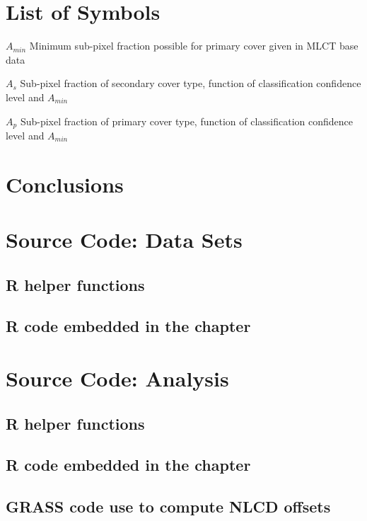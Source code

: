 \documentclass[draftthesis]{neiuthesis}
\begin{document}
\chapter{List of Symbols}

\begin{symbollist}[0.7in]
\item[$A_{min}$] Minimum sub-pixel fraction possible for primary cover
  given in MLCT base data
\item[$A_s$] Sub-pixel fraction of secondary cover type, function of
  classification confidence level and $A_{min}$
\item[$A_p$] Sub-pixel fraction of primary cover type, function of
  classification confidence level and $A_{min}$
\end{symbollist}

\mainmatter

\todototoc
\listoftodos





\chapter{Conclusions}




\backmatter



\appendix

\chapter{Source Code: Data Sets}

\section*{R helper functions}


\section*{R code embedded in the chapter}



\chapter{Source Code: Analysis}

\section*{R helper functions}


\section*{R code embedded in the chapter}


\section*{GRASS code use to compute NLCD offsets}

\end{document}
